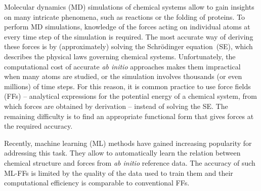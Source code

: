 \documentclass[%
superscriptaddress,
reprint,
nofootinbib,
amsmath,amssymb,amsfonts,
floatfix,
altaffilletter,
showkeys,
]{revtex4-2}
\begin{document}
Molecular dynamics (MD) simulations of chemical systems allow to gain insights on many intricate phenomena, such as reactions or the folding of proteins.\cite{warshel2002molecular} To perform MD simulations, knowledge of the forces acting on individual atoms at every time step of the simulation is required.\cite{karplus2002molecular} The most accurate way of deriving these forces is by (approximately) solving the Schr\"odinger equation~(SE), which describes the physical laws governing chemical systems.\cite{dirac1929quantum} Unfortunately,
the computational cost of accurate \textit{ab initio} approaches\cite{gordon2005theory} makes them impractical when many atoms are studied, or the simulation involves thousands (or even millions) of time steps. For this reason, it is common practice to use force fields (FFs) -- analytical expressions for the potential energy of a chemical system, from which forces are obtained by derivation -- instead of solving the SE.\cite{unke2020high}
The remaining difficulty is to find an appropriate functional form that gives forces at the required accuracy.

Recently, machine learning (ML) methods have gained increasing popularity for addressing this task.\cite{bartok2010gaussian,rupp2012fast,bartok2017machine,gastegger2018wacsf,schutt2019unifying,unke2020machine,von2020exploring,noe2020machinemolsim,glielmo2021unsupervised,keith2021combining} They allow to automatically learn the relation between chemical structure and forces from \emph{ab initio} reference data. The accuracy of such ML-FFs is limited by the quality of the data used to train them and their computational efficiency is comparable to conventional FFs.\cite{unke2020machine,sauceda2020molecular}
\end{document}
